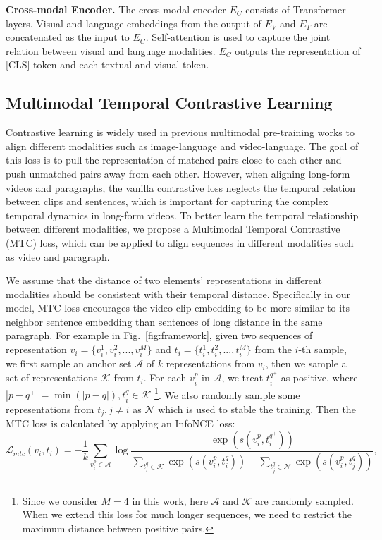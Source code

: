\documentclass{article}
\begin{document}
\textbf{Cross-modal Encoder.}
The cross-modal encoder $E_C$ consists of Transformer layers. Visual and language embeddings from the output of $E_V$ and $E_T$ are concatenated as the input to $E_C$. Self-attention is used to capture the joint relation between visual and language modalities. $E_C$ outputs the representation of [CLS] token and each textual and visual token.

\subsection{Multimodal Temporal Contrastive Learning}\label{mtcl}
Contrastive learning is widely used in previous multimodal pre-training works to align different modalities such as image-language and video-language. 
The goal of this loss is to pull the representation of matched pairs close to each other and push unmatched pairs away from each other.
However, when aligning long-form videos and paragraphs, the vanilla contrastive loss neglects the temporal relation between clips and sentences, which is important for capturing the complex temporal dynamics in long-form videos.
To better learn the temporal relationship between different modalities, we propose a Multimodal Temporal Contrastive (MTC) loss, which can be applied to align sequences in different modalities such as video and paragraph.  

We assume that the distance of two elements' representations in different modalities should be consistent with their temporal distance. Specifically in our model, MTC loss encourages the video clip embedding to be more similar to its neighbor sentence embedding than sentences of long distance in the same paragraph.
For example in Fig.~\ref{fig:framework}, 
given two sequences of representation $ v_i = \{v_i^1, v_i^2,..., v_i^M\}$ and $t_i = \{t_i^1, t_i^2,..., t_i^M\}$ from the $i$-th sample, we first sample an anchor set $\mathcal{A}$ of $k$ representations from $v_i$, then we sample a set of representations $\mathcal{K}$ from $t_i$. For each $v_i^p$ in $\mathcal{A}$, we treat $t_i^{q^+}$ as positive, where $|p-q^+| = \min(|p-q|), t_i^q \in \mathcal{K}$ \footnote{Since we consider $M=4$ in this work, here $\mathcal{A}$ and $\mathcal{K}$ are randomly sampled. When we extend this loss for much longer sequences, we need to restrict the maximum distance between positive pairs.}. We also randomly sample some representations from $t_j, j\neq i$ as $\mathcal{N}$ which is used to stable the training. Then the MTC loss is calculated by applying an InfoNCE loss:
\begin{equation}
\mathcal{L}_{mtc}(v_i, t_i) =-\frac{1}{k}\sum_{v_i^p \in \mathcal{A}}\log \frac{\exp \left(s(v_i^p, t_i^{q^+})\right)}{\sum_{t_i^q \in \mathcal{K}} \exp \left(s(v_i^p,t_i^q)\right) + \sum_{t_{j}^{q} \in \mathcal{N}} \exp \left(s(v_i^p,t_{j}^{q})\right)},
\end{equation}
\end{document}
